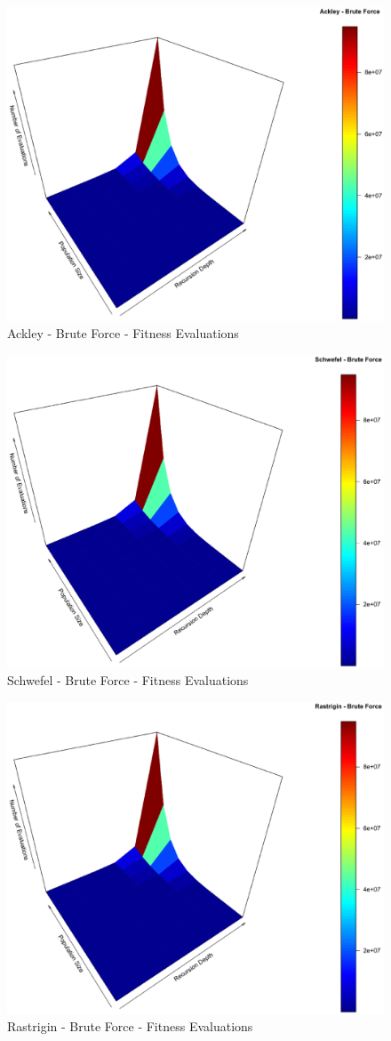 \documentclass[conference]{IEEEtran}
\begin{document}
\begin{figure}[tbp]
\centering
\includegraphics[width=1.0\hsize,height=0.65\hsize]{fig22.eps}
\caption{Ackley - Brute Force - Fitness Evaluations}
\label{fig27}
\end{figure}

\begin{figure}[tbp]
\centering
\includegraphics[width=1.0\hsize,height=0.65\hsize]{fig25.eps}
\caption{Schwefel - Brute Force - Fitness Evaluations}
\label{fig28}
\end{figure}

\begin{figure}[tbp]
\centering
\includegraphics[width=1.0\hsize,height=0.65\hsize]{fig28.eps}
\caption{Rastrigin - Brute Force - Fitness Evaluations}
\label{fig29}
\end{figure}
\end{document}
